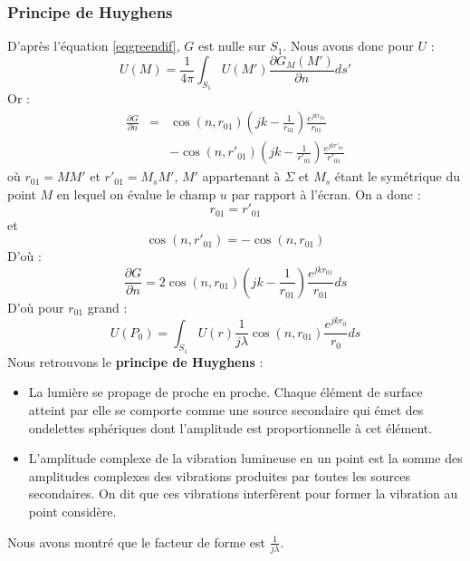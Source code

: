 \documentclass[12pt]{book}
\begin{document}
\subsubsection{Principe de Huyghens}\label{secHuyghens}
D'apr\`es l'\'equation \ref{eqgreendif}, $G$ est nulle sur $S_1$.
Nous avons donc pour $U$ :
\begin{equation}
U(M)=\frac{1}{4\pi}\int_{S_1}U(M')\frac{\partial G_M(M')}{\partial n}ds'
\end{equation}
Or :
\begin{eqnarray}
\frac{\partial G}{\partial n}&=&\cos
(n,r_{01})(jk-\frac{1}{r_{01}})\frac{e^{jkr_{01}}}{r_{01}}\\
&&-\cos(n,r'_{01})(jk-\frac{1}{r'_{01}})\frac{e^{jkr'_{01}}}{r'_{01}}
\end{eqnarray}
o\`u $r_{01}=MM'$ et $r'_{01}=M_sM'$, $M'$ appartenant \`a $\Sigma$ et
$M_s$ \'etant le sym\'etrique du point $M$ en lequel on \'evalue le
champ $u$ par rapport \`a l'\'ecran. On a donc :
\begin{equation}
r_{01}=r'_{01}
\end{equation}
et 
\begin{equation}
\cos(n,r'_{01})=-\cos(n,r_{01})
\end{equation}
D'o\`u :
\begin{equation}
\frac{\partial G}{\partial n}=
2\cos(n,r_{01})(jk-\frac{1}{r_{01}})\frac{e^{jkr_{01}}}{r_{01}}ds 
\end{equation}
D'o\`u pour $r_{01}$ grand :
\begin{equation}
U(P_0)=\int_{S_1}U(r)\frac{1}{j\lambda}\cos(n,r_{01})
\frac{e^{jkr_0}}{r_0}ds 
\end{equation}
Nous retrouvons le {\bf principe de Huyghens} :
\begin{prin}
\begin{itemize}
\item La lumi\`ere se propage de proche en proche. Chaque \'el\'ement
de surface 
atteint par elle se comporte comme une source secondaire qui \'emet des
ondelettes sph\'eriques dont l'amplitude est proportionnelle \`a cet
\'el\'ement.
\item L'amplitude complexe de la vibration lumineuse en un point est la
somme des amplitudes complexes des vibrations produites par toutes les
sources secondaires. On dit que ces vibrations interf\`erent pour former
la vibration au point consid\`ere.
\end{itemize}
\end{prin}
\begin{rem}
Nous avons montr\'e que le facteur de forme est $\frac{1}{j\lambda}$.
\end{rem}
\end{document}
